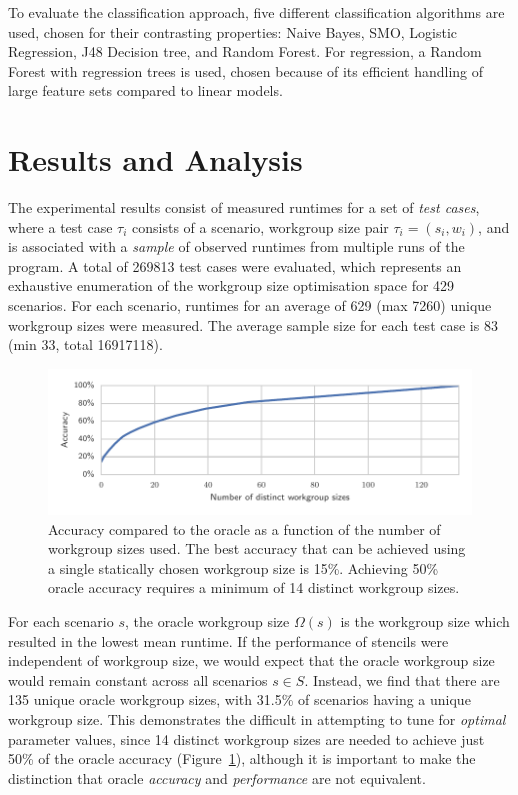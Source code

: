 \documentclass[nonatbib,preprint,10pt]{sigplanconf}
\begin{document}
To evaluate the classification approach, five different classification
algorithms are used, chosen for their contrasting properties: Naive
Bayes, SMO, Logistic Regression, J48 Decision tree, and Random
Forest. For regression, a Random Forest with regression trees is used,
chosen because of its efficient handling of large feature sets
compared to linear models.


\section{Results and Analysis}

The experimental results consist of measured runtimes for a set of
\emph{test cases}, where a test case $\tau_i$ consists of a scenario,
workgroup size pair $\tau_i = (s_i,w_i)$, and is associated with a
\emph{sample} of observed runtimes from multiple runs of the
program. A total of 269813 test cases were evaluated, which represents
an exhaustive enumeration of the workgroup size optimisation space for
429 scenarios. For each scenario, runtimes for an average of 629 (max
7260) unique workgroup sizes were measured. The average sample size
for each test case is 83 (min 33, total 16917118).


\begin{figure}
\centering
\includegraphics[width=\columnwidth]{img/num_params_oracle.pdf}
\caption[Oracle accuracy vs.\ number of workgroup sizes]{%
  Accuracy compared to the oracle as a function of the number of
  workgroup sizes used. The best accuracy that can be achieved using a
  single statically chosen workgroup size is 15\%. Achieving 50\%
  oracle accuracy requires a minimum of 14 distinct workgroup sizes.%
}
\label{fig:oracle-accuracy}
\end{figure}

For each scenario $s$, the oracle workgroup size $\Omega(s)$ is the
workgroup size which resulted in the lowest mean runtime. If the
performance of stencils were independent of workgroup size, we would
expect that the oracle workgroup size would remain constant across all
scenarios $s \in S$. Instead, we find that there are 135 unique oracle
workgroup sizes, with 31.5\% of scenarios having a unique workgroup
size. This demonstrates the difficult in attempting to tune for
\emph{optimal} parameter values, since 14 distinct workgroup sizes are
needed to achieve just 50\% of the oracle accuracy
(Figure~\ref{fig:oracle-accuracy}), although it is important to make
the distinction that oracle \emph{accuracy} and \emph{performance} are
not equivalent.
\end{document}
